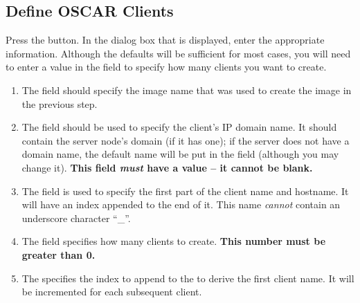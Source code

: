 
\subsection{Define OSCAR Clients}
\label{det:define-clients}

Press the  button.  In the dialog box
that is displayed, enter the appropriate information.  Although the
defaults will be sufficient for most cases, you will need to enter a
value in the  field to specify how many clients
you want to create.

\begin{enumerate}
  
\item The  field should specify the image name that
  was used to create the image in the previous step.
  
\item The  field should be used to specify the
  client's IP domain name.  
%
  It should contain the server node's domain (if it has one); if the
  server does not have a domain name, the default name
   will be put in the field (although you may
  change it).
%
  {\bf This field \emph{must} have a value -- it cannot be blank.}
%

\item The  field is used to specify the first part of
  the client name and hostname. It will have an index appended to the
  end of it. This name \emph{cannot} contain an underscore 
  character ``\_''.

\item The  field specifies how many clients to
  create.  {\bf This number must be greater than 0.}
  
\item The  specifies the index to append to the
   to derive the first client name. It will be
  incremented for each subsequent client.
  

\end{enumerate}
